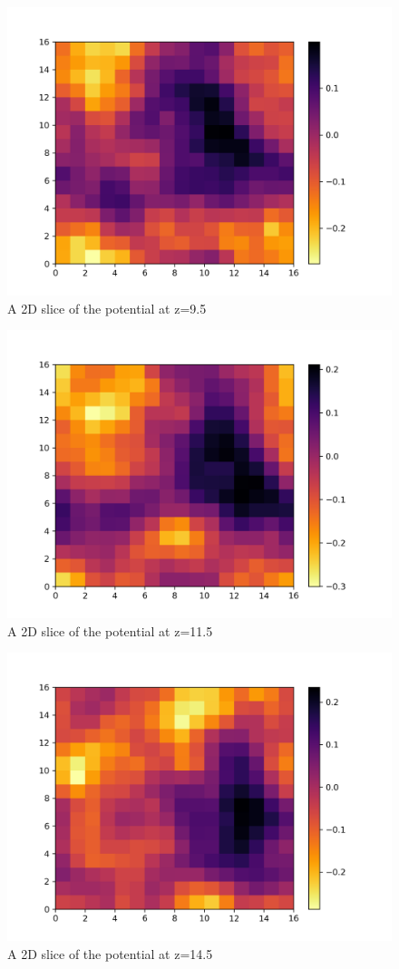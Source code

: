 \documentclass[a4paper,10pt]{article}
\begin{document}
\begin{figure}[H]
  \centering
  \includegraphics[width=.8\linewidth]{./plots/potential_9.5.png}
  \caption{A 2D slice of the potential at z=9.5}
  \label{fig:for_9}
\end{figure}

\begin{figure}[H]
  \centering
  \includegraphics[width=.8\linewidth]{./plots/potential_11.5.png}
  \caption{A 2D slice of the potential at z=11.5}
  \label{fig:for_11}
\end{figure}

\begin{figure}[H]
  \centering
  \includegraphics[width=.8\linewidth]{./plots/potential_14.5.png}
  \caption{A 2D slice of the potential at z=14.5}
  \label{fig:for_14}
\end{figure}
\end{document}
